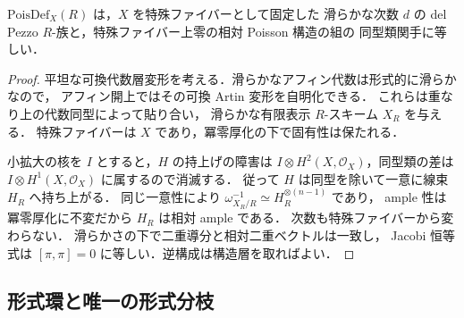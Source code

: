 \begin{lemma}
\label{lem:poisson-geometric-artin}
$\mathrm{PoisDef}_X(R)$ は，$X$ を特殊ファイバーとして固定した
滑らかな次数 $d$ の del Pezzo $R$-族と，特殊ファイバー上零の相対 Poisson 構造の組の
同型類関手に等しい．
\end{lemma}
\begin{proof}
平坦な可換代数層変形を考える．滑らかなアフィン代数は形式的に滑らかなので，
アフィン開上ではその可換 Artin 変形を自明化できる．
これらは重なり上の代数同型によって貼り合い，
滑らかな有限表示 $R$-スキーム $X_R$ を与える．
特殊ファイバーは $X$ であり，冪零厚化の下で固有性は保たれる．

小拡大の核を $I$ とすると，$H$ の持上げの障害は
$I\otimes H^2(X,\mathcal O_X)$，同型類の差は
$I\otimes H^1(X,\mathcal O_X)$ に属するので消滅する．
従って $H$ は同型を除いて一意に線束 $H_R$ へ持ち上がる．
同じ一意性により $\omega_{X_R/R}^{-1}\simeq H_R^{\otimes(n-1)}$ であり，
ample 性は冪零厚化に不変だから $H_R$ は相対 ample である．
次数も特殊ファイバーから変わらない．
滑らかさの下で二重導分と相対二重ベクトルは一致し，
Jacobi 恒等式は $[\pi,\pi]=0$ に等しい．逆構成は構造層を取ればよい．
\end{proof}

\subsection{形式環と唯一の形式分枝}

